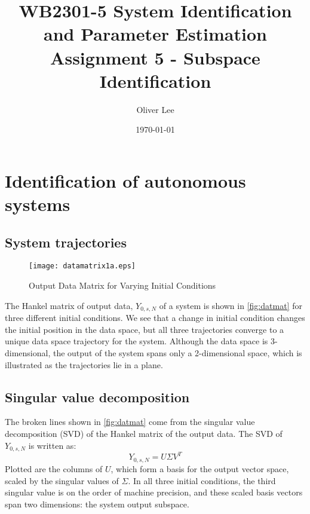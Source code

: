 \documentclass[11pt,a4paper]{article}
\title{WB2301-5 System Identification and Parameter Estimation \\
Assignment 5 - Subspace Identification}
\author{Oliver Lee}
\date{\today}
\begin{document}
\maketitle

\section{Identification of autonomous systems}

\subsection{System trajectories}
\begin{figure}
    \centering
    \texttt{[image: datamatrix1a.eps]}
    \caption{Output Data Matrix for Varying Initial Conditions}
    \label{fig:datmat}
\end{figure}
The Hankel matrix of output data, $Y_{0,s,N}$ of a system is shown in
\autoref{fig:datmat} for three different initial conditions. We see that a
change in initial condition changes the initial position in the data space, but
all three trajectories converge to a unique data space trajectory for the
system.  Although the data space is 3-dimensional, the output of the system
spans only a 2-dimensional space, which is illustrated as the trajectories lie
in a plane.

\subsection{Singular value decomposition}
The broken lines shown in \autoref{fig:datmat} come from the singular value
decomposition (SVD) of the Hankel matrix of the output data. The SVD of
$Y_{0, s, N}$ is written as:
\begin{equation}
    \label{eq:svd}
    Y_{0, s, N} = U \Sigma V^T
\end{equation}
Plotted are the columns of $U$, which form a basis for the output vector space,
scaled by the singular values of $\Sigma$. In all three initial conditions, the
third singular value is on the order of machine precision, and these scaled
basis vectors span two dimensions: the system output subspace.

\end{document}
